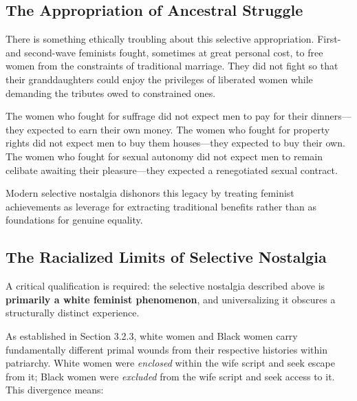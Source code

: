\documentclass[12pt, letterpaper]{article}
\begin{document}
\subsection{The Appropriation of Ancestral Struggle}

There is something ethically troubling about this selective appropriation. First- and second-wave feminists fought, sometimes at great personal cost, to free women from the constraints of traditional marriage. They did not fight so that their granddaughters could enjoy the privileges of liberated women while demanding the tributes owed to constrained ones.

The women who fought for suffrage did not expect men to pay for their dinners---they expected to earn their own money. The women who fought for property rights did not expect men to buy them houses---they expected to buy their own. The women who fought for sexual autonomy did not expect men to remain celibate awaiting their pleasure---they expected a renegotiated sexual contract.

Modern selective nostalgia dishonors this legacy by treating feminist achievements as leverage for extracting traditional benefits rather than as foundations for genuine equality.

\subsection{The Racialized Limits of Selective Nostalgia}

A critical qualification is required: the selective nostalgia described above is \textbf{primarily a white feminist phenomenon}, and universalizing it obscures a structurally distinct experience.

As established in Section 3.2.3, white women and Black women carry fundamentally different primal wounds from their respective histories within patriarchy. White women were \textit{enclosed} within the wife script and seek escape from it; Black women were \textit{excluded} from the wife script and seek access to it. This divergence means:
\end{document}

